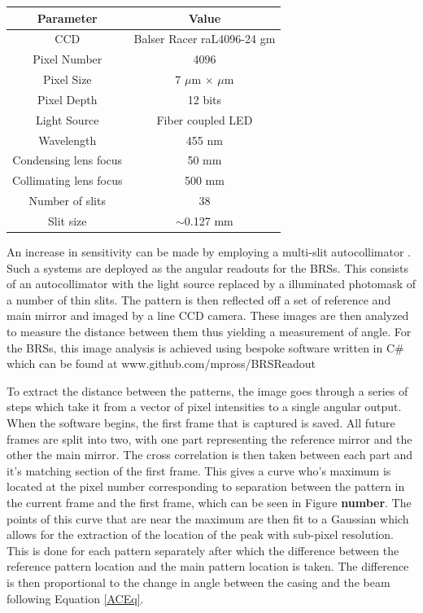 \documentclass [12pt, proquest]{uwthesis}[2019]
\begin{document}
\begin{center}
\begin{tabular}{| c | c |}
\hline
Parameter & Value\\
\hline \hline
CCD & Balser Racer raL4096-24 gm\\
Pixel Number & 4096\\
Pixel Size & 7 $\mu$m $\times$  $\mu$m\\
Pixel Depth & 12 bits\\
Light Source & Fiber coupled LED\\
Wavelength & 455 nm\\
Condensing lens focus & 50 mm\\
Collimating lens focus & 500 mm\\
Number of slits & 38\\
Slit size & $\sim$0.127 mm\\
\hline
\end{tabular}
\label{ACTable}
\end{center}

An increase in sensitivity can be made by employing a multi-slit autocollimator \cite{MSA}. Such a systems are deployed as the angular readouts for the BRSs. This consists of an autocollimator with the light source replaced by a illuminated photomask of a number of thin slits. The pattern is then reflected off a set of reference and main mirror and imaged by a line CCD camera. These images are then analyzed to measure the distance between them thus yielding a measurement of angle. For the BRSs, this image analysis is achieved using bespoke software written in C\# which can be found at www.github.com/mpross/BRSReadout

To extract the distance between the patterns, the image goes through a series of steps which take it from a vector of pixel intensities to a single angular output. When the software begins, the first frame that is captured is saved. All future frames are split into two, with one part representing the reference mirror and the other the main mirror. The cross correlation is then taken between each part and it's matching section of the first frame. This gives a curve who's maximum is located at the pixel number corresponding to separation between the pattern in the current frame and the first frame, which can be seen in Figure \textbf{number}. The points of this curve that are near the maximum are then fit to a Gaussian which allows for the extraction of the location of the peak with sub-pixel resolution. This is done for each pattern separately after which the difference between the reference pattern location and the main pattern location is taken. The difference is then proportional to the change in angle between the casing and the beam following Equation \ref{ACEq}.
\end{document}

